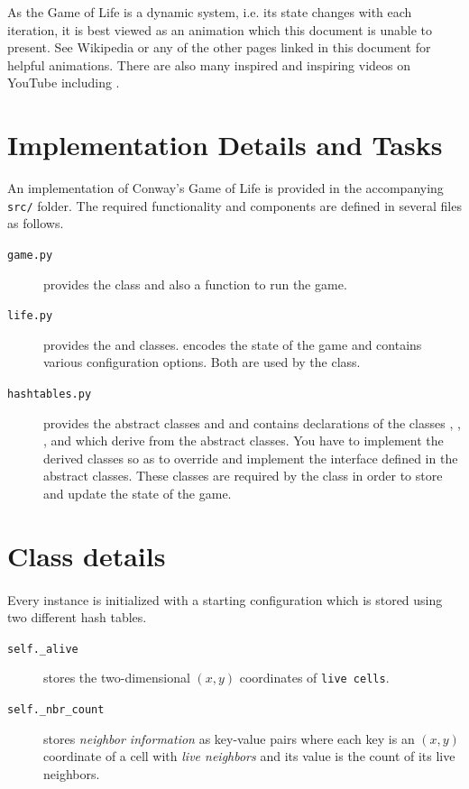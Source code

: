 \documentclass[addpoints]{exam}
\begin{document}
As the Game of Life is a dynamic system, i.e. its state changes with each iteration, it is best viewed as an animation which this document is unable to present. See Wikipedia \cite{wp_gol} or any of the other pages linked in this document for helpful animations. There are also many inspired and inspiring videos on YouTube including \cite{yt_gol}.

\section*{Implementation Details and Tasks}

An implementation of Conway's Game of Life is provided in the accompanying \texttt{src/} folder. The required functionality and components are defined in several files as follows.
\begin{description}
  \item[\texttt{game.py}] provides the  class and also a  function to run the game.
  \item[\texttt{life.py}] provides the  and  classes.  encodes the state of the game and  contains various configuration options. Both are used by the  class.
  \item[\texttt{hashtables.py}] provides the abstract classes  and  and contains declarations of the classes , , , and  which derive from the abstract classes. You have to implement the derived classes so as to override and implement the interface defined in the abstract classes. These classes are required by the  class in order to store and update the state of the game.
\end{description}

\section*{Class details}

\paragraph{} Every instance is initialized with a starting configuration which is stored using two different hash tables.
\begin{description}
  \item[\texttt{self.\_alive}] stores the two-dimensional $(x,y)$ coordinates of \texttt{live cells}.
  \item[\texttt{self.\_nbr\_count}] stores \textit{neighbor information} as key-value pairs where each key is an $(x,y)$ coordinate of a cell with \textit{live neighbors} and its value is the count of its live neighbors.
\end{description}
\end{document}
